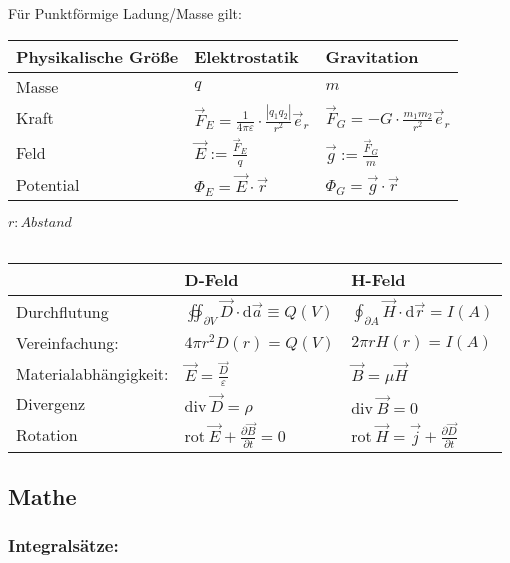\documentclass[10pt,a4paper]{scrartcl}
\begin{document}
\everymath{\displaystyle} %
Für Punktförmige Ladung/Masse gilt:\\
\begin{tabular}{l|l|l}
	Physikalische Größe & Elektrostatik & Gravitation \\ \hline
	Masse & $q$ & $m$ \\
	Kraft & $\vec F_E=\frac{1}{4\pi \varepsilon} \cdot \frac{|q_1 q_2|}{r^2}\vec e_r$ & $\vec F_G = -G \cdot \frac{m_1 m_2}{r^2}\vec e_r$ \\
	Feld & $\vec E:=\frac{\vec F_E}{q}$ & $\vec g:= \frac{\vec F_G}{m}$ \\
	Potential & $\Phi _E=\vec E \cdot \vec r$ & $\Phi_G=\vec g \cdot \vec r$\\
\end{tabular}
$r: Abstand$\\
\\
\newline
\newline
\begin{tabular}{l|l|l}
	 & D-Feld & H-Feld \\ \hline
	Durchflutung & $\oiint_{\partial V} \vec D \cdot \mathrm d\vec a \equiv Q(V)$ & $\oint_{\partial A} \vec H \cdot \mathrm d\vec r=I(A)$ \\
	Vereinfachung: & $4\pi r^2 D(r)=Q(V)$ & $2\pi r H(r)=I(A)$ \\
	Materialabhängigkeit: & $\vec E = \frac{\vec D}{\varepsilon}$ & $\vec B = \mu \vec H$ \\
	Divergenz & $\mathrm{div}\ \vec D = \rho $ & $\mathrm{div}\ \vec B = 0 $ \\
	Rotation & $\mathrm{rot}\ \vec E + \frac{\partial \vec B}{\partial t} = 0 $ & $\mathrm{rot}\ \vec H = \vec j + \frac{\partial \vec D}{\partial t}$\\
\end{tabular}
\everymath{\textstyle} %

\subsection{Mathe}

\subsubsection{Integralsätze:}
	
\end{document}
